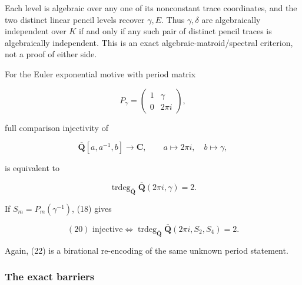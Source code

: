 \documentclass[11pt]{article}
\theoremstyle{keio}
\theoremstyle{definition}
\theoremstyle{remark}
\begin{document}
Each level is algebraic over any one of its nonconstant trace coordinates,
and the two distinct linear pencil levels recover \(\gamma,E\). Thus
\(\gamma,\delta\) are algebraically independent over \(K\) if and only if
any such pair of distinct pencil traces is algebraically independent. This
is an exact algebraic-matroid/spectral criterion, not a proof of either side.

For the Euler exponential motive with period matrix

\[
 P_\gamma=\begin{pmatrix}1&\gamma\\0&2\pi i\end{pmatrix},
\]

full comparison injectivity of

\[
 \overline{\mathbf Q}[a,a^{-1},b]\longrightarrow\mathbf C,
 \qquad a\mapsto2\pi i,\quad b\mapsto\gamma,                              \tag{GT-20}
\]

is equivalent to

\[
 \operatorname{trdeg}_{\overline{\mathbf Q}}
 \overline{\mathbf Q}(2\pi i,\gamma)=2.                                   \tag{GT-21}
\]

If \(S_m=P_m(\gamma^{-1})\), (18) gives

\[
 \boxed{
 (20)\text{ injective}
 \iff
 \operatorname{trdeg}_{\overline{\mathbf Q}}
 \overline{\mathbf Q}(2\pi i,S_2,S_4)=2.}                                 \tag{GT-22}
\]

Again, (22) is a birational re-encoding of the same unknown period
statement.

\subsubsection{The exact barriers}
\end{document}

